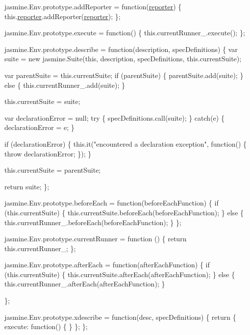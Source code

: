 \begin{DoxyCodeInclude}
jasmine.Env.prototype.addReporter = \textcolor{keyword}{function}(\hyperlink{classreporter}{reporter}) \{
  this.\hyperlink{classreporter}{reporter}.addReporter(\hyperlink{classreporter}{reporter});
\};

jasmine.Env.prototype.execute = \textcolor{keyword}{function}() \{
  this.currentRunner\_.execute();
\};

jasmine.Env.prototype.describe = \textcolor{keyword}{function}(description, specDefinitions) \{
  var suite = \textcolor{keyword}{new} jasmine.Suite(\textcolor{keyword}{this}, description, specDefinitions, this.currentSuite);

  var parentSuite = this.currentSuite;
  \textcolor{keywordflow}{if} (parentSuite) \{
    parentSuite.add(suite);
  \} \textcolor{keywordflow}{else} \{
    this.currentRunner\_.add(suite);
  \}

  this.currentSuite = suite;

  var declarationError = null;
  \textcolor{keywordflow}{try} \{
    specDefinitions.call(suite);
  \} \textcolor{keywordflow}{catch}(e) \{
    declarationError = e;
  \}

  \textcolor{keywordflow}{if} (declarationError) \{
    this.it(\textcolor{stringliteral}{"encountered a declaration exception"}, \textcolor{keyword}{function}() \{
      \textcolor{keywordflow}{throw} declarationError;
    \});
  \}

  this.currentSuite = parentSuite;

  \textcolor{keywordflow}{return} suite;
\};

jasmine.Env.prototype.beforeEach = \textcolor{keyword}{function}(beforeEachFunction) \{
  \textcolor{keywordflow}{if} (this.currentSuite) \{
    this.currentSuite.beforeEach(beforeEachFunction);
  \} \textcolor{keywordflow}{else} \{
    this.currentRunner\_.beforeEach(beforeEachFunction);
  \}
\};

jasmine.Env.prototype.currentRunner = \textcolor{keyword}{function} () \{
  \textcolor{keywordflow}{return} this.currentRunner\_;
\};

jasmine.Env.prototype.afterEach = \textcolor{keyword}{function}(afterEachFunction) \{
  \textcolor{keywordflow}{if} (this.currentSuite) \{
    this.currentSuite.afterEach(afterEachFunction);
  \} \textcolor{keywordflow}{else} \{
    this.currentRunner\_.afterEach(afterEachFunction);
  \}

\};

jasmine.Env.prototype.xdescribe = \textcolor{keyword}{function}(desc, specDefinitions) \{
  \textcolor{keywordflow}{return} \{
    execute: \textcolor{keyword}{function}() \{
    \}
  \};
\};


\end{DoxyCodeInclude}
